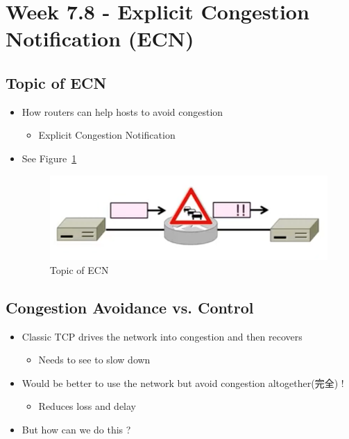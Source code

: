 \documentclass[12pt]{ctexart}   %
\begin{document}
\section{Week 7.8 - Explicit Congestion Notification (ECN)}
	\subsection{Topic of ECN}
	\begin{itemize}
		\item How routers can help hosts to avoid congestion
		\begin{itemize}
			\item Explicit Congestion Notification
		\end{itemize}
		\item See Figure~\ref{fig:7-8-1}
		  
		 \begin{figure}[h!] %
		\centering
		 \includegraphics[scale=0.7]{images/7-8-1}
		\caption{ Topic of ECN }
		 \label{fig:7-8-1}
		 \end{figure}
	\end{itemize}
	
	\subsection{Congestion Avoidance vs. Control}
	\begin{itemize}
		\item Classic TCP drives the network into congestion and then recovers
		\begin{itemize}
			\item Needs to see to slow down
		\end{itemize}
		
		\item Would be better to use the network but avoid congestion altogether(完全) !
		\begin{itemize}
			\item Reduces loss and delay
		\end{itemize}
		
		\item But how can we do this ?
	\end{itemize}
	
\end{document}
